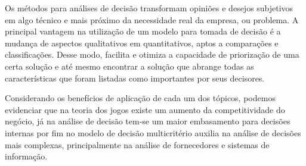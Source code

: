 \documentclass[
	12pt,				%
	openright,			%
	oneside,			%
	a4paper,			%
	english,			%
	french,				%
	spanish,			%
	brazil				%
	]{abntex2}
\begin{document}
Os métodos para análises de decisão transformam opiniões e desejos subjetivos em algo técnico e mais próximo da necessidade real da empresa, ou problema. A principal vantagem na utilização de um modelo para tomada de decisão é a mudança de aspectos qualitativos em quantitativos, aptos a comparações e classificações. Desse modo, facilita e otimiza a capacidade de priorização de uma certa solução e até mesmo encontrar a solução que abrange todas as características que foram listadas como importantes por seus decisores.

	Considerando os benefícios de aplicação de cada um dos tópicos, podemos evidenciar que na teoria dos jogos existe um aumento da competitividade do negócio, já na análise de decisão tem-se um maior embasamento para decisões internas por fim no modelo de decisão multicritério auxilia na análise de decisões mais complexas, principalmente na análise de fornecedores e sistemas de informação.


 




%
%




\printindex
\end{document}
